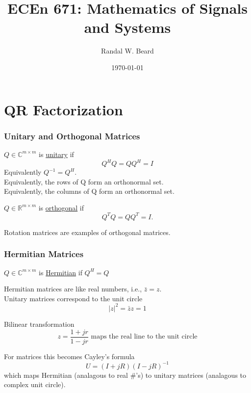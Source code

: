 \documentclass{beamer}
\title{ECEn 671: Mathematics of Signals and Systems}
\author{Randal W. Beard}
\institute{Brigham Young University}
\date{\today}
\begin{document}
\begin{frame}
	\titlepage
\end{frame}


\section{QR Factorization}
\frame{\sectionpage}

\begin{frame}\frametitle{Unitary and Orthogonal Matrices}
	\begin{definition}
	$Q \in \mathbb{C}^{m\times m}$ is \underline{unitary} if
	\[ 
		Q^HQ = QQ^H = I 
	\]
	Equivalently $Q^{-1} = Q^H$.  \\
	Equivalently, the rows of Q form an orthonormal set. \\
	Equivalently, the columns of Q form an orthonormal set.
	\end{definition}

	\begin{definition}
	$Q \in \mathbb{R}^{m \times m} $ is \underline{orthogonal} if 
	\[ 
		Q^TQ = QQ^T = I.
	\]
	\end{definition}
	
	\vfill
	
	Rotation matrices are examples of orthogonal matrices.
\end{frame}

\begin{frame}\frametitle{Hermitian Matrices}
	\begin{definition}
	$Q \in \mathbb{C}^{m \times m}$ is \underline{Hermitian} if $Q^H = Q$
	\end{definition}
	
	\vfill
	
	Hermitian matrices are like real numbers, i.e., $\bar{z} = z$.\\
	Unitary matrices correspond to the unit circle
	\[ |z|^2 = \bar{z}z = 1 \]

	\vfill
	
	Bilinear transformation
	\[ 
		z = \frac{1 + jr}{1 - jr} \text{ maps the real line to the unit circle} 
	\]
	
	For matrices this becomes Cayley's formula
	\[ 
		U = (I+jR)(I-jR)^{-1} 
	\]
	which maps Hermitian (analagous to real \#'s) to unitary matrices (analagous to complex unit circle).
\end{frame}
\end{document}
